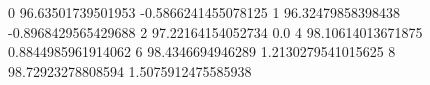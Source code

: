 0 96.63501739501953 -0.5866241455078125
1 96.32479858398438 -0.8968429565429688
2 97.22164154052734 0.0
4 98.10614013671875 0.8844985961914062
6 98.4346694946289 1.2130279541015625
8 98.72923278808594 1.5075912475585938
